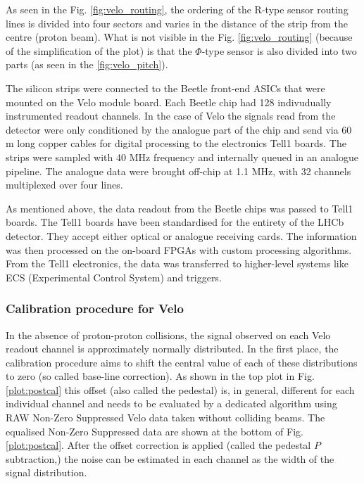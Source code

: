 As seen in the Fig. \ref{fig:velo_routing}, the ordering of the R-type sensor routing lines is divided into four sectors and varies in the distance of the strip from the centre (proton beam). What is not visible in the Fig. \ref{fig:velo_routing} (because of the simplification of the plot) is that the $\Phi$-type sensor is also divided into two parts (as seen in the \ref{fig:velo_pitch}).

The silicon strips were connected to the Beetle front-end ASICs that were mounted on the Velo module board.
Each Beetle chip had 128 indivudually instrumented readout channels. In the case of Velo the signals read from the detector were only conditioned by the analogue part of the chip and send via 60 m long copper cables for digital processing to the electronics Tell1 boards. 
The strips were sampled with 40 MHz frequency and internally queued \cite{Löchner:1000429} in an analogue pipeline.
The analogue data were brought off-chip at 1.1 MHz, with 32 channels multiplexed over four lines.

As mentioned above, the data readout from the Beetle chips was passed to Tell1 boards.
The Tell1 boards have been standardised for the entirety of the LHCb detector.
They accept either optical or analogue receiving cards.
The information was then processed on the on-board FPGAs with custom processing algorithms.
From the Tell1 electronics, the data was transferred to higher-level systems like ECS (Experimental Control System) and triggers.

\subsubsection{Calibration procedure for Velo}
\label{chap2:calibration}
In the absence of proton-proton collisions, the signal observed on each Velo readout channel is approximately normally distributed.
In the first place, the calibration procedure aims to shift the central value of each of these distributions to zero (so called base-line correction).
As shown in the top plot in Fig. \ref{plot:postcal} this offset (also called the pedestal) is, in general, different for each individual channel and needs to be evaluated by a dedicated algorithm using RAW Non-Zero Suppressed Velo data taken without colliding beams.
The equalised Non-Zero Suppressed data are shown at the bottom of Fig. \ref{plot:postcal}.
After the offset correction is applied (called the pedestal $P$ subtraction,\cite{Aaij:1707015}) the noise can be estimated in each channel as the width of the signal distribution.


